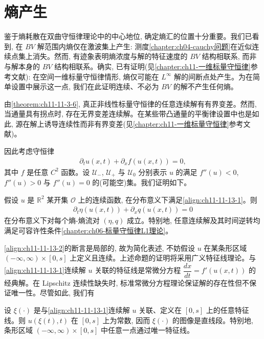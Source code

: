 \documentclass[../../main.tex]{subfiles}
\begin{document}
\section{熵产生}\label{section:ch11-熵产生}

鉴于熵耗散在双曲守恒律理论中的中心地位, 确定熵汇的位置十分重要。我们已看到, 在 $BV$ 解范围内熵仅在激波集上产生: 测度\cref{chapter:ch04-cauchy问题}在近似连续点集上消失。然而, 有迹象表明熵浓度与解的特征速度的 $BV$ 结构相联系, 而非与解本身的 $BV$ 结构相联系。确实, 已有证明(见\cref{chapter:ch11-一维标量守恒律}参考文献): 在空间一维标量守恒律情形, 熵仅可能在 $L^\infty$ 解的间断点处产生。为在简单设置中展示这一点, 我们在此证明连续、不必为 $BV$ 的解不产生任何熵。


由\cref{theorem:ch11-11-3-6}, 真正非线性标量守恒律的任意连续解有有界变差。然而, 当通量具有拐点时, 存在无界变差连续解。在某些带凸通量的平衡律设置中也是如此, 源在解上诱导连续性而非有界变差(见\cref{chapter:ch11-一维标量守恒律}参考文献)。


因此考虑守恒律
\begin{align}
\partial_t u(x,t)+\partial_x f(u(x,t))=0,\label{align:ch11-11-13-1}
\end{align}
其中 $f$ 是任意 $C^2$ 函数。设 $\mathscr{U}_-$, $\mathscr{U}_+$ 与 $\mathscr{U}_0$ 分别表示 $u$ 的满足 $f''(u)<0$, $f''(u)>0$ 与 $f''(u)=0$ 的(可能空)集。我们证明如下。

\begin{theorem}\label{theorem:ch11-11-13-1}
假设 $u$ 是 $\mathbb{R}^2$ 某开集 $\mathscr{O}$ 上的连续函数, 在分布意义下满足\eqref{align:ch11-11-13-1}。则
\begin{align}
\partial_t\eta(u(x,t))+\partial_x q(u(x,t))=0\label{align:ch11-11-13-2}
\end{align}
在分布意义下对每个熵-熵流对 $(\eta,q)$ 成立。特别地, 任意连续解及其时间逆转均满足可容许性条件\cref{chapter:ch06-标量守恒律L1理论}。

\end{theorem}

\eqref{align:ch11-11-13-2}的断言是局部的, 故为简化表述, 不妨假设 $u$ 在某条形区域 $(-\infty,\infty)\times[0,s]$ 上定义且连续。上述命题的证明将采用广义特征线理论。与\eqref{align:ch11-11-13-1}连续解 $u$ 关联的特征线是常微分方程 $\dfrac{dx}{dt}=f'(u(x,t))$ 的经典解。在 Lipschitz 连续性缺失时, 标准常微分方程理论保证解的存在性但不保证唯一性。尽管如此, 我们有

\begin{lemma}\label{lemma:ch11-11-13-2}
设 $\xi(\cdot)$ 是与\eqref{align:ch11-11-13-1}连续解 $u$ 关联、定义在 $[0,s]$ 上的任意特征线。则 $u(\xi(t),t)$ 在 $[0,s]$ 上为常数, 因而 $\xi(\cdot)$ 的图像是直线段。特别地, 条形区域 $(-\infty,\infty)\times[0,s]$ 中任意一点通过唯一特征线。
\end{lemma}
\end{document}

